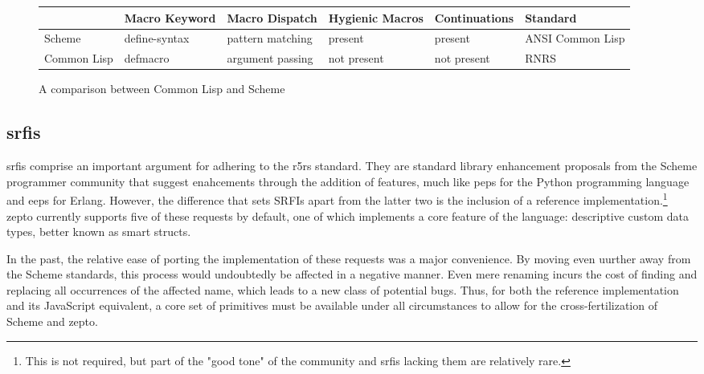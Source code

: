 \documentclass[oneside,11pt,xetex]{scrbook}
\begin{document}
\begin{center}
\begin{figure}
  \begin{tabu}{| l | l | l | l | l | l |}
  \hline
  \rowfont{\footnotesize}
              & Macro Keyword & Macro Dispatch   & Hygienic Macros & Continuations & Standard\\ \hline
  \rowfont{\footnotesize}
  Scheme      & define-syntax & pattern matching & present         & present       & ANSI Common Lisp\\ \hline
  \rowfont{\footnotesize}
  Common Lisp & defmacro      & argument passing & not present     & not present   & RNRS\\ \hline
  \end{tabu}
  \caption{A comparison between Common Lisp and Scheme}
\label{fig:lispcomp}
\end{figure}
\end{center}

\subsection{\glspl{srfi}}

\glspl{srfi} comprise an important argument for adhering to the \gls{r5rs} standard. They are
standard library enhancement proposals from the Scheme programmer community that suggest
enahcements through the addition of features, much like \glspl{pep} for the Python
programming language and \glspl{eep} for Erlang. However, the difference that sets SRFIs
apart from the latter two is the inclusion of a reference implementation.\footnote{This
is not required, but part of the "good tone" of the community and \gls{srfi}s lacking them
are relatively rare.} zepto currently supports five of these requests by default,
one of which implements a core feature of the language: descriptive custom data types, better
known as smart structs.

In the past, the relative ease of porting the implementation of these requests was a major
convenience. By moving even uurther away from the Scheme standards, this process would
undoubtedly be affected in a negative manner. Even mere renaming incurs the cost of finding
and replacing all occurrences of the affected name, which leads to a new class of potential
bugs. Thus, for both the reference implementation and its
JavaScript equivalent, a core set of primitives must be available under all circumstances
to allow for the cross-fertilization of Scheme and zepto.
\end{document}
